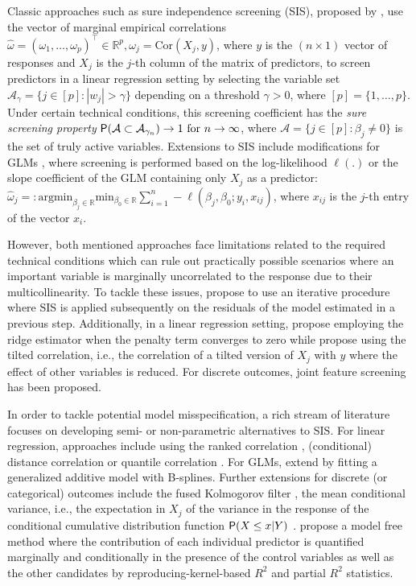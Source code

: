 \documentclass[
  article]{jss}
\begin{document}
Classic approaches such as sure independence screening (SIS), proposed
by \citet{Fan2007SISforUHD}, use the vector of marginal empirical
correlations
\(\hat\omega=(\omega_1,\ldots ,\omega_p)^\top\in\mathbb{R}^p,\omega_j=\text{Cor}(X_{j},y)\),
where \(y\) is the \((n\times 1)\) vector of responses and \(X_{j}\) is
the \(j\)-th column of the matrix of predictors, to screen predictors in
a linear regression setting by selecting the variable set
\(\mathcal{A}_\gamma = \{j\in [p]:|w_j|>\gamma\}\) depending on a
threshold \(\gamma>0\), where \([p]=\{1,\dots,p\}\). Under certain
technical conditions, this screening coefficient has the \emph{sure
screening property}
\(\mathsf{P}(\mathcal{A} \subset \mathcal{A}_{\gamma_n})\to 1 \text{ for } n\to \infty\),
where \(\mathcal{A}=\{j\in[p]:\beta_j\neq 0\}\) is the set of truly
active variables. Extensions to SIS include modifications for GLMs
\citep{Fan2010sisglms}, where screening is performed based on the
log-likelihood \(\ell(.)\) or the slope coefficient of the GLM
containing only \(X_j\) as a predictor:
\(\hat\omega_j=: \text{argmin}_{\beta_j\in\mathbb{R}}\text{min}_{{\beta_0}\in\mathbb{R}}\sum_{i=1}^n -\ell(\beta_j,\beta_0;y_i,x_{ij})\),
where \(x_{ij}\) is the \(j\)-th entry of the vector \(x_i\).

However, both mentioned approaches face limitations related to the
required technical conditions which can rule out practically possible
scenarios where an important variable is marginally uncorrelated to the
response due to their multicollinearity. To tackle these issues,
\citet{fan2009ultrahigh} propose to use an iterative procedure where SIS
is applied subsequently on the residuals of the model estimated in a
previous step. Additionally, in a linear regression setting,
\citet{Wang2015HOLP} propose employing the ridge estimator when the
penalty term converges to zero while \citet{cho2012high} propose using
the tilted correlation, i.e., the correlation of a tilted version of
\(X_j\) with \(y\) where the effect of other variables is reduced. For
discrete outcomes, joint feature screening \citep{SMLE2014} has been
proposed.

In order to tackle potential model misspecification, a rich stream of
literature focuses on developing semi- or non-parametric alternatives to
SIS. For linear regression, approaches include using the ranked
correlation \citep{zhu2011model}, (conditional) distance correlation
\citep{li2012feature, wang2015conditional} or quantile correlation
\citep{ma2016robust}. For GLMs, \citet{fan2011nonparametric} extend
\citet{Fan2010sisglms} by fitting a generalized additive model with
B-splines. Further extensions for discrete (or categorical) outcomes
include the fused Kolmogorov filter \citep{mai2013kolmogorov}, the mean
conditional variance, i.e., the expectation in \(X_j\) of the variance
in the response of the conditional cumulative distribution function
\(\mathsf{P}(X\leq x|Y)\) \citep{cui2015model}. \citet{ke2023sufficient}
propose a model free method where the contribution of each individual
predictor is quantified marginally and conditionally in the presence of
the control variables as well as the other candidates by
reproducing-kernel-based \(R^2\) and partial \(R^2\) statistics.
\end{document}

